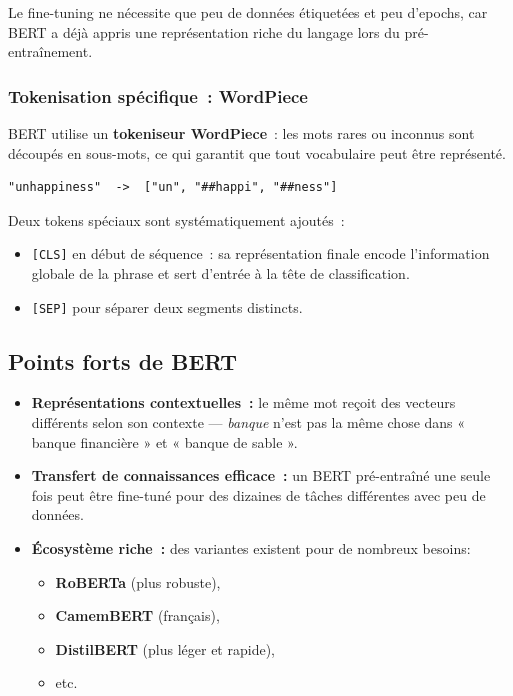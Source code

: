 \documentclass[12pt,a4paper]{report}
\begin{document}
Le fine-tuning ne nécessite que peu de données étiquetées et peu d'epochs, car BERT
a déjà appris une représentation riche du langage lors du pré-entraînement.

\subsubsection{Tokenisation spécifique~: WordPiece}

BERT utilise un \textbf{tokeniseur WordPiece}~: les mots rares ou inconnus sont découpés
en sous-mots, ce qui garantit que tout vocabulaire peut être représenté.

\begin{lstlisting}[language={}]
"unhappiness"  ->  ["un", "##happi", "##ness"]
\end{lstlisting}

Deux tokens spéciaux sont systématiquement ajoutés~:
\begin{itemize}[leftmargin=1.5cm]
  \item \texttt{[CLS]} en début de séquence~: sa représentation finale encode l'information globale de la phrase et sert d'entrée à la tête de classification.
  \item \texttt{[SEP]} pour séparer deux segments distincts.
\end{itemize}

\subsection{Points forts de BERT}

\begin{itemize}[leftmargin=1.5cm]
  \item \textbf{Représentations contextuelles~:} le même mot reçoit des vecteurs
    différents selon son contexte — \textit{banque} n'est pas la même chose dans
    « banque financière » et « banque de sable ».
  \item \textbf{Transfert de connaissances efficace~:} un BERT pré-entraîné une seule
    fois peut être fine-tuné pour des dizaines de tâches différentes avec peu de données.
  \item \textbf{Écosystème riche~:} des variantes existent pour de nombreux besoins:
  \begin{itemize}[leftmargin=1.5cm]
    \item \textbf{RoBERTa} (plus robuste), 
    \item \textbf{CamemBERT} (français),
    \item \textbf{DistilBERT} (plus léger et rapide), 
    \item etc. 
  \end{itemize}
\end{itemize}
\end{document}
